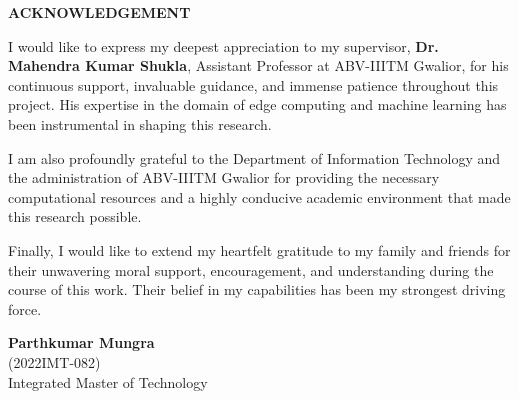\begin{center}
\vspace*{0.5in}
\textbf{ACKNOWLEDGEMENT}\\
\end{center}
\vspace*{0.2in}

I would like to express my deepest appreciation to my supervisor, \textbf{Dr. Mahendra Kumar Shukla}, Assistant Professor at ABV-IIITM Gwalior, for his continuous support, invaluable guidance, and immense patience throughout this project. His expertise in the domain of edge computing and machine learning has been instrumental in shaping this research.

I am also profoundly grateful to the Department of Information Technology and the administration of ABV-IIITM Gwalior for providing the necessary computational resources and a highly conducive academic environment that made this research possible. 

Finally, I would like to extend my heartfelt gratitude to my family and friends for their unwavering moral support, encouragement, and understanding during the course of this work. Their belief in my capabilities has been my strongest driving force.

\vspace{1.5in}
\noindent
\begin{minipage}[t]{0.5\textwidth}
\end{minipage}
\begin{minipage}[t]{0.5\textwidth}
\textbf{Parthkumar Mungra}\\
(2022IMT-082)\\
Integrated Master of Technology
\end{minipage}

